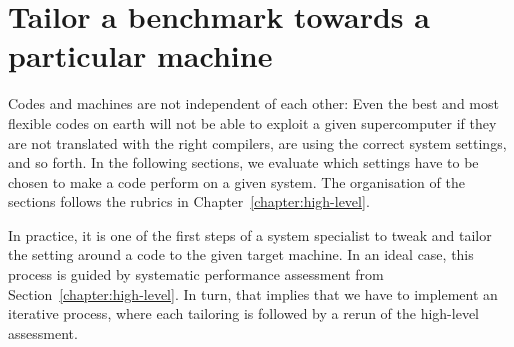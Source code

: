 \chapter{Tailor a benchmark towards a particular machine}

Codes and machines are not independent of each other: 
Even the best and most flexible codes on earth will not be able to exploit a given supercomputer if they are not translated with the right compilers, are using the correct system settings, and so forth.
In the following sections, we evaluate which settings have to be chosen to make a code perform on a given system.
The organisation of the sections follows the rubrics in Chapter~\ref{chapter:high-level}.


In practice, it is one of the first steps of a system specialist to tweak and tailor the setting around a code to the given target machine.
In an ideal case, this process is guided by systematic performance assessment from Section~\ref{chapter:high-level}.   
In turn, that implies that we have to implement an iterative process, where each tailoring is followed by a rerun of the high-level assessment.


